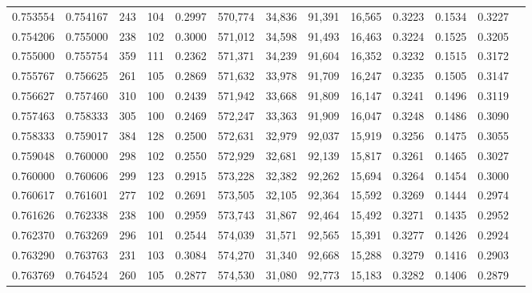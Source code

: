 \begin{tabular}{rrrrrrrrrrrrr}
0.753554 & 0.754167 &    243 &   104 &                                     0.2997 & 570,774 &  34,836 &  91,391 &  16,565 & 0.3223 & 0.1534 & 0.3227 \\
0.754206 & 0.755000 &    238 &   102 &                                     0.3000 & 571,012 &  34,598 &  91,493 &  16,463 & 0.3224 & 0.1525 & 0.3205 \\
0.755000 & 0.755754 &    359 &   111 &                                     0.2362 & 571,371 &  34,239 &  91,604 &  16,352 & 0.3232 & 0.1515 & 0.3172 \\
0.755767 & 0.756625 &    261 &   105 &                                     0.2869 & 571,632 &  33,978 &  91,709 &  16,247 & 0.3235 & 0.1505 & 0.3147 \\
0.756627 & 0.757460 &    310 &   100 &                                     0.2439 & 571,942 &  33,668 &  91,809 &  16,147 & 0.3241 & 0.1496 & 0.3119 \\
0.757463 & 0.758333 &    305 &   100 &                                     0.2469 & 572,247 &  33,363 &  91,909 &  16,047 & 0.3248 & 0.1486 & 0.3090 \\
0.758333 & 0.759017 &    384 &   128 &                                     0.2500 & 572,631 &  32,979 &  92,037 &  15,919 & 0.3256 & 0.1475 & 0.3055 \\
0.759048 & 0.760000 &    298 &   102 &                                     0.2550 & 572,929 &  32,681 &  92,139 &  15,817 & 0.3261 & 0.1465 & 0.3027 \\
0.760000 & 0.760606 &    299 &   123 &                                     0.2915 & 573,228 &  32,382 &  92,262 &  15,694 & 0.3264 & 0.1454 & 0.3000 \\
0.760617 & 0.761601 &    277 &   102 &                                     0.2691 & 573,505 &  32,105 &  92,364 &  15,592 & 0.3269 & 0.1444 & 0.2974 \\
0.761626 & 0.762338 &    238 &   100 &                                     0.2959 & 573,743 &  31,867 &  92,464 &  15,492 & 0.3271 & 0.1435 & 0.2952 \\
0.762370 & 0.763269 &    296 &   101 &                                     0.2544 & 574,039 &  31,571 &  92,565 &  15,391 & 0.3277 & 0.1426 & 0.2924 \\
0.763290 & 0.763763 &    231 &   103 &                                     0.3084 & 574,270 &  31,340 &  92,668 &  15,288 & 0.3279 & 0.1416 & 0.2903 \\
0.763769 & 0.764524 &    260 &   105 &                                     0.2877 & 574,530 &  31,080 &  92,773 &  15,183 & 0.3282 & 0.1406 & 0.2879 \\

\end{tabular}
